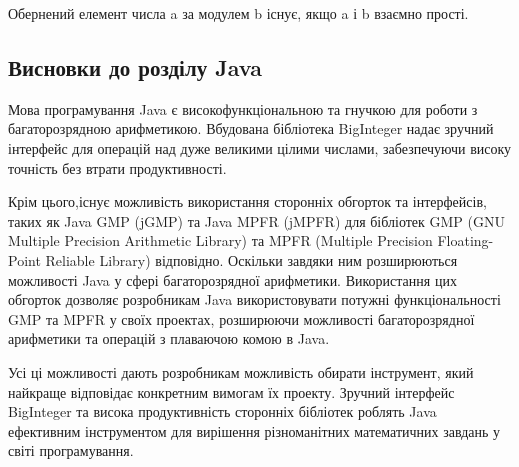 Обернений елемент числа a за модулем b існує, якщо a і b взаємно прості.

\subsection{Висновки до розділу Java}

Мова програмування Java є високофункціональною та гнучкою для роботи з багаторозрядною арифметикою. Вбудована бібліотека BigInteger надає зручний інтерфейс для операцій над дуже великими цілими числами, забезпечуючи високу точність без втрати продуктивності.

Крім цього,існує можливість використання сторонніх обгорток та інтерфейсів, таких як Java GMP (jGMP) та Java MPFR (jMPFR) для бібліотек GMP (GNU Multiple Precision Arithmetic Library) та MPFR (Multiple Precision Floating-Point Reliable Library) відповідно. Оскільки завдяки ним розширюються можливості Java у сфері багаторозрядної арифметики. Використання цих обгорток дозволяє розробникам Java використовувати потужні функціональності GMP та MPFR у своїх проектах, розширюючи можливості багаторозрядної арифметики та операцій з плаваючою комою в Java.

Усі ці можливості дають розробникам можливість обирати інструмент, який найкраще відповідає конкретним вимогам їх проекту. Зручний інтерфейс BigInteger та висока продуктивність сторонніх бібліотек роблять Java ефективним інструментом для вирішення різноманітних математичних завдань у світі програмування.